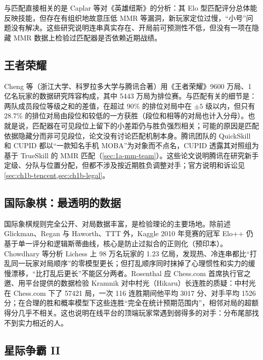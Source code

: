 与匹配直接相关的是 Caplar 等对《英雄纽斯》的分析：其 Elo 型匹配评分总体能反映技能，但存在有组织地故意压低 MMR 等漏洞，新玩家定位过慢，“小号”问题没有解决\cite{caplar2013analysis}\tagLit。这些研究说明连串真实存在、开局前可预测性不低，但没有一项在隐藏 MMR 数据上检验过匹配器是否依赖近期战绩。

\subsection{王者荣耀}\label{sec:1a-games-hok}

Cheng 等（浙江大学、科罗拉多大学与腾讯合著）用《王者荣耀》9600 万局、1 亿名玩家的数据研究阵容构成，其中 5443 万局为排位赛\cite{cheng2019makes}\tagLit。与匹配有关的细节是：两队成员段位等级之和的差值，在超过 90\% 的排位对局中在 $\pm5$ 级以内，但只有 28.7\% 的排位对局由段位和较低的一方获胜（段位和相等的对局也计入分母）。也就是说，匹配器在可见段位上留下的小差距仍与胜负强烈相关；可能的原因是匹配依据隐藏分而非可见段位，论文没有讨论匹配机制本身。腾讯团队的 QuickSkill 和 CUPID 都以“一款知名手机 MOBA”为对象而不点名，CUPID 透露其对照组为基于 TrueSkill 的 MMR 匹配（\cref{sec:1a-mm-team}）\cite{zhang2022quickskill,fan2024cupid}\tagLit。这些论文说明腾讯在研究新手定级、分队与位置分配，但都不涉及按近期胜负调整对手；官方说明和诉讼见\cref{sec:ch1b-tencent,sec:ch1b-legal}。

\subsection{国际象棋：最透明的数据}\label{sec:1a-games-chess}

国际象棋规则完全公开、对局数据丰富，是检验理论的主要场地。除前述 Glickman、Regan 与 Haworth、TTT 外，Kaggle 2010 年竞赛的冠军 Elo++ 仍基于单一评分和逻辑斯蒂曲线，核心是防止过拟合的正则化（预印本）\cite{sismanis2010how}\tagLit。Chowdhary 等分析 Lichess 上 98 万名玩家的 1.23 亿局，发现热、冷连串都比“打乱同一玩家对局顺序”的零模型更长\cite{chowdhary2023quantifying}\tagLit；但打乱顺序同时抹掉了心理惯性和实力的缓慢漂移，“比打乱后更长”不能区分两者\tagOwn。Rosenthal 应 Chess.com 首席执行官之邀、用平台提供的数据检验 Kramnik 对中村光（Hikaru）长连胜的质疑：中村光在 Chess.com 下了 57421 局，一次 116 连胜期间他平均 3017 分、对手平均 1526 分；在合理的胜和概率模型下这些连胜“完全在统计预期范围内”，相邻对局的超额得分几乎不相关\cite{rosenthal2025investigation}\tagLit。这也说明在线平台的顶端玩家常遇到弱得多的对手：分布尾部找不到实力相近的人。

\subsection{星际争霸 II}\label{sec:1a-games-sc2}

